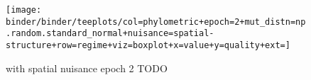 \begin{figure*}
  \centering
  \texttt{[image: binder/binder/teeplots/col=phylometric+epoch=2+mut\_distn=np.random.standard\_normal+nuisance=spatial-structure+row=regime+viz=boxplot+x=value+y=quality+ext=]}
  \caption{with spatial nuisance epoch 2 TODO}
  \label{fig:reconstructed-tree-phylometrics-with-spatial-nuisance-epoch2}
\end{figure*}
